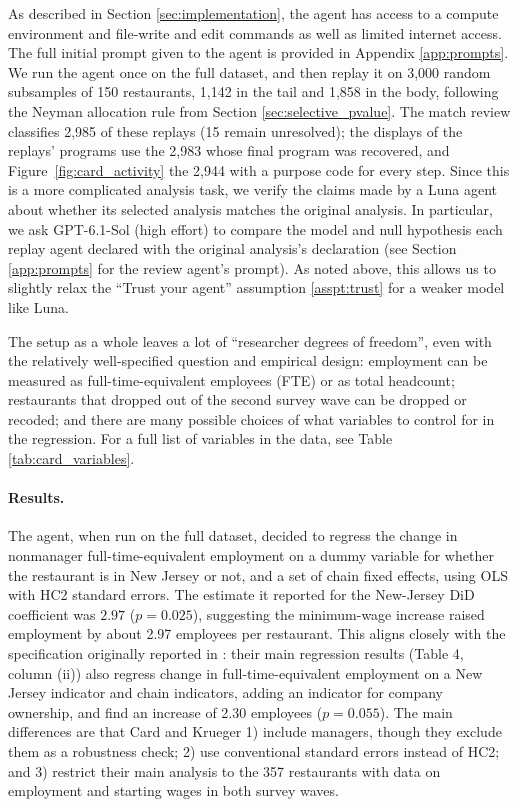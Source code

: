 \documentclass[10pt]{article}
\begin{document}
As described in Section \ref{sec:implementation}, the agent has access to a compute environment and file-write and edit commands as well as limited internet access. The full initial prompt given to the agent is provided in Appendix \ref{app:prompts}. We run the agent once on the full dataset, and then replay it on 3,000 random subsamples of 150 restaurants, 1,142 in the tail and 1,858 in the body, following the Neyman allocation rule from Section \ref{sec:selective_pvalue}. The match review classifies 2,985 of these replays (15 remain unresolved); the displays of the replays' programs use the 2,983 whose final program was recovered, and Figure~\ref{fig:card_activity} the 2,944 with a purpose code for every step. Since this is a more complicated analysis task, we verify the claims made by a Luna agent about whether its selected analysis matches the original analysis. In particular, we ask GPT-6.1-Sol (high effort) to compare the model and null hypothesis each replay agent declared with the original analysis's declaration (see Section \ref{app:prompts} for the review agent's prompt). As noted above, this allows us to slightly relax the ``Trust your agent'' assumption \ref{asspt:trust} for a weaker model like Luna.

The setup as a whole leaves a lot of ``researcher degrees of freedom'', even with the relatively well-specified question and empirical design: employment can be measured as full-time-equivalent employees (FTE) or as total headcount; restaurants that dropped out of the second survey wave can be dropped or recoded; and there are many possible choices of what variables to control for in the regression. For a full list of variables in the data, see Table \ref{tab:card_variables}.

\paragraph{Results.} The agent, when run on the full dataset, decided to regress the change in nonmanager full-time-equivalent employment on a dummy variable for whether the restaurant is in New Jersey or not, and a set of chain fixed effects, using OLS with HC2 standard errors. The estimate it reported for the New-Jersey DiD coefficient was $2.97$ ($p=0.025$), suggesting the minimum-wage increase raised employment by about 2.97 employees per restaurant. This aligns closely with the specification originally reported in \citet{card1994minimum}: their main regression results (Table 4, column (ii)) also regress change in full-time-equivalent employment on a New Jersey indicator and chain indicators, adding an indicator for company ownership, and find an increase of 2.30 employees ($p=0.055$). The main differences are that Card and Krueger 1) include managers, though they exclude them as a robustness check; 2) use conventional standard errors instead of HC2; and 3) restrict their main analysis to the 357 restaurants with data on employment and starting wages in both survey waves.
\end{document}
